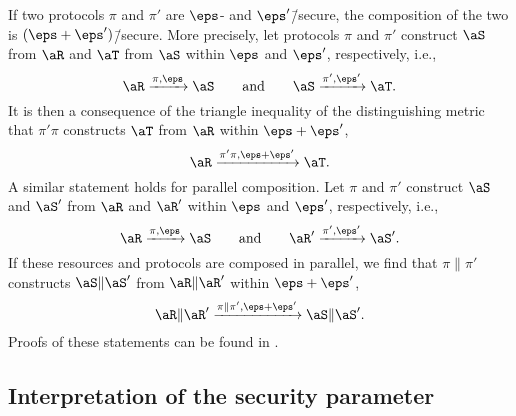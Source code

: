 

If two protocols $\pi$ and $\pi'$ are
$\eps$- and $\eps'$\=/secure, the composition of the two is
$(\eps+\eps')$\=/secure. More precisely, let protocols $\pi$ and
$\pi'$ construct $\aS$ from $\aR$ and $\aT$
from $\aS$ within $\eps$ and $\eps'$, respectively,
i.e.,
\[\aR \xrightarrow{\pi,\eps}\aS \qquad \text{and}
  \qquad \aS \xrightarrow{\pi',\eps'}\aT.\] It is
then a consequence of the triangle inequality of the distinguishing
metric that $\pi'\pi$ constructs $\aT$ from $\aR$
within $\eps+\eps'$,
\[\aR \xrightarrow{\pi'\pi,\eps+\eps'}\aT.\] A similar
statement holds for parallel composition. Let $\pi$ and $\pi'$
construct $\aS$ and $\aS'$ from $\aR$ and
$\aR'$ within $\eps$ and $\eps'$, respectively, i.e.,
\[\aR \xrightarrow{\pi,\eps}\aS \qquad \text{and}
\qquad \aR' \xrightarrow{\pi',\eps'} \aS'.\]
If these resources and protocols are composed in parallel, we find that $\pi \| \pi'$ constructs $\aS \| \aS'$ from $\aR \| \aR'$ within $\eps+\eps'$, 
\[\aR \| \aR' \xrightarrow{\pi \| \pi',\eps+\eps'}
\aS \| \aS'.\]
Proofs of these statements can be found in \textcite{MR11,Mau12}.


\subsection{Interpretation of the security parameter}
\label{sec:ac.interpretation}

